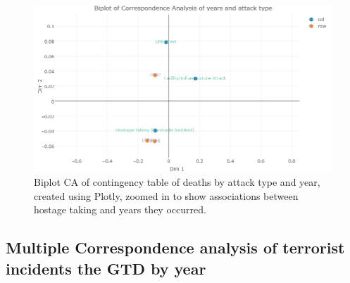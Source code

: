 \begin{figure}[t]
\includegraphics[width=15cm]{Peters_experiment_markdown_files/figure-latex/hostagetakingbiplot.png}
\caption{Biplot CA of contingency table of deaths by attack type and year, created using Plotly, zoomed in to show associations between hostage taking and years they occurred.}
\label{fig:biplotattacktypeca3}
\centering
\end{figure}

\subsection{Multiple Correspondence analysis of terrorist incidents the GTD by year}\label{viewing-deaths-by-attack-vector-type-MCA}

